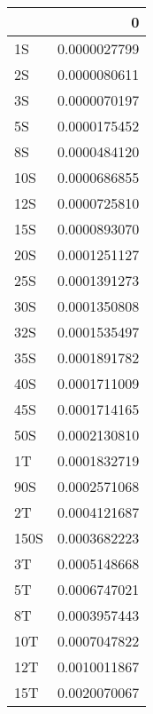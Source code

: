 \begin{tabular}{lr}
\toprule
{} &            0 \\
\midrule
1S   & 0.0000027799 \\
2S   & 0.0000080611 \\
3S   & 0.0000070197 \\
5S   & 0.0000175452 \\
8S   & 0.0000484120 \\
10S  & 0.0000686855 \\
12S  & 0.0000725810 \\
15S  & 0.0000893070 \\
20S  & 0.0001251127 \\
25S  & 0.0001391273 \\
30S  & 0.0001350808 \\
32S  & 0.0001535497 \\
35S  & 0.0001891782 \\
40S  & 0.0001711009 \\
45S  & 0.0001714165 \\
50S  & 0.0002130810 \\
1T   & 0.0001832719 \\
90S  & 0.0002571068 \\
2T   & 0.0004121687 \\
150S & 0.0003682223 \\
3T   & 0.0005148668 \\
5T   & 0.0006747021 \\
8T   & 0.0003957443 \\
10T  & 0.0007047822 \\
12T  & 0.0010011867 \\
15T  & 0.0020070067 \\
\bottomrule
\end{tabular}
